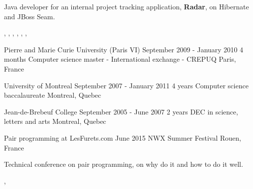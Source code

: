 \documentclass[a4paper]{article}
\begin{document}
\begin{cvexperience}%
  Java developer for an internal project tracking application,
  \textbf{Radar}, on Hibernate and JBoss Seam.

  \begin{cvexperiencetech}%
    ,
    ,
    ,
    ,
    ,
    ,
  \end{cvexperiencetech}
\end{cvexperience}



\cvexperiencetitle
{Pierre and Marie Curie University (Paris VI)}
{September 2009 - January 2010}
{4 months}
{Computer science master - International exchange - CREPUQ}
{Paris, France}

\vspace{1em}

\cvexperiencetitle
{University of Montreal}
{September 2007 - January  2011}
{4 years}
{Computer science baccalaureate}
{Montreal, Quebec}

\vspace{1em}

\cvexperiencetitle
{Jean-de-Brebeuf College}
{September 2005 - June 2007}
{2 years}
{DEC in science, letters and arts}
{Montreal, Quebec}

\vspace{1em}



\cvexperiencetitle
  {Pair programming at LesFurets.com}
  {}
  {June 2015}
  {NWX Summer Festival}
  {Rouen, France}

\begin{cvexperience}%
  Technical conference on pair programming, on why do it and how to do it well.

  \begin{cvexperiencetech}[Tags]%
    ,
  \end{cvexperiencetech}
\end{cvexperience}
\end{document}
